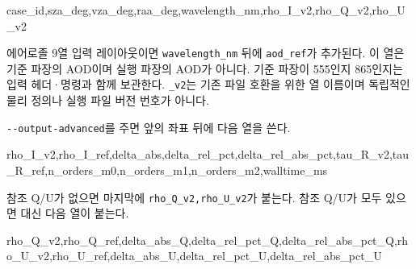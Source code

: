 \begin{ManualCode}
case_id,sza_deg,vza_deg,raa_deg,wavelength_nm,rho_I_v2,rho_Q_v2,rho_U_v2
\end{ManualCode}

에어로졸 9열 입력 레이아웃이면 \texttt{wavelength\_\allowbreak{}nm} 뒤에 \texttt{aod\_\allowbreak{}ref}가 추가된다. 이 열은 기준 파장의 AOD이며 실행 파장의 AOD가 아니다. 기준 파장이 555인지 865인지는 입력 헤더·명령과 함께 보관한다. \texttt{\_\allowbreak{}v2}는 기존 파일 호환을 위한 열 이름이며 독립적인 물리 정의나 실행 파일 버전 번호가 아니다.

\texttt{-\allowbreak{}-\allowbreak{}output-\allowbreak{}advanced}를 주면 앞의 좌표 뒤에 다음 열을 쓴다.


\begin{ManualCode}
rho_I_v2,rho_I_ref,delta_abs,delta_rel_pct,delta_rel_abs_pct,tau_R_v2,tau_R_ref,n_orders_m0,n_orders_m1,n_orders_m2,walltime_ms
\end{ManualCode}

참조 Q/U가 없으면 마지막에 \texttt{rho\_\allowbreak{}Q\_\allowbreak{}v2,\allowbreak{}rho\_\allowbreak{}U\_\allowbreak{}v2}가 붙는다. 참조 Q/U가 모두 있으면 대신 다음 열이 붙는다.


\begin{ManualCode}
rho_Q_v2,rho_Q_ref,delta_abs_Q,delta_rel_pct_Q,delta_rel_abs_pct_Q,rho_U_v2,rho_U_ref,delta_abs_U,delta_rel_pct_U,delta_rel_abs_pct_U
\end{ManualCode}


